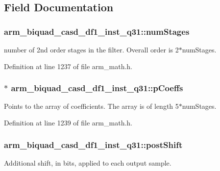 \subsection{Field Documentation}
\hypertarget{structarm__biquad__casd__df1__inst__q31_a2c2b579f1df1d8273a5d9d945c27e1b2}{
\subsubsection[{num\-Stages}]{ arm\-\_\-biquad\-\_\-casd\-\_\-df1\-\_\-inst\-\_\-q31\-::num\-Stages}}\label{structarm__biquad__casd__df1__inst__q31_a2c2b579f1df1d8273a5d9d945c27e1b2}
number of 2nd order stages in the filter. Overall order is 2$\ast$num\-Stages. 

Definition at line 1237 of file arm\-\_\-math.\-h.

\hypertarget{structarm__biquad__casd__df1__inst__q31_aa62366c632f3b5305086f841f079dbd2}{
\subsubsection[{p\-Coeffs}]{$\ast$ arm\-\_\-biquad\-\_\-casd\-\_\-df1\-\_\-inst\-\_\-q31\-::p\-Coeffs}}\label{structarm__biquad__casd__df1__inst__q31_aa62366c632f3b5305086f841f079dbd2}
Points to the array of coefficients. The array is of length 5$\ast$num\-Stages. 

Definition at line 1239 of file arm\-\_\-math.\-h.

\hypertarget{structarm__biquad__casd__df1__inst__q31_a636c7fbe09ec4bef0bc0a4b4e2151cbe}{
\subsubsection[{post\-Shift}]{ arm\-\_\-biquad\-\_\-casd\-\_\-df1\-\_\-inst\-\_\-q31\-::post\-Shift}}\label{structarm__biquad__casd__df1__inst__q31_a636c7fbe09ec4bef0bc0a4b4e2151cbe}
Additional shift, in bits, applied to each output sample. 

